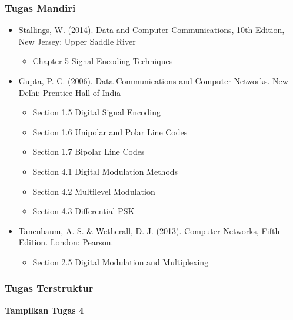 \documentclass[pdflatex,compress]{beamer}
\begin{document}
\begin{frame}
	\frametitle{Tugas Mandiri}
	\begin{itemize}
		\item Stallings, W. (2014). Data and Computer Communications, 10th Edition, New Jersey: Upper Saddle River\\
		\begin{itemize}
			\item Chapter 5 Signal Encoding Techniques
		\end{itemize}
		\item Gupta, P. C. (2006). Data Communications and Computer Networks. New Delhi: Prentice Hall of India\\
		\begin{itemize}
			\item Section 1.5 Digital Signal Encoding
			\item Section 1.6 Unipolar and Polar Line Codes
			\item Section 1.7 Bipolar Line Codes
			\item Section 4.1 Digital Modulation Methods
			\item Section 4.2 Multilevel Modulation
			\item Section 4.3 Differential PSK
		\end{itemize}
		\item Tanenbaum, A. S. \& Wetherall, D. J. (2013). Computer Networks, Fifth Edition. London: Pearson.\\
		\begin{itemize}
			\item Section 2.5 Digital Modulation and Multiplexing
		\end{itemize}
	\end{itemize}
\end{frame}

\begin{frame}
	\frametitle{Tugas Terstruktur}
	\textbf{Tampilkan Tugas 4}
\end{frame}
\end{document}
